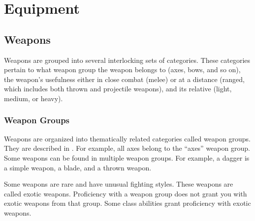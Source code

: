\chapter{Equipment}

\section{Weapons}\label{Weapons}

    Weapons are grouped into several interlocking sets of categories. These categories pertain to what weapon group the weapon belongs to (axes, bows, and so on), the weapon's usefulness either in close combat (melee) or at a distance (ranged, which includes both thrown and projectile weapons), and its relative  (light, medium, or heavy).

    \subsection{Weapon Groups}\label{Weapon Groups}

        Weapons are organized into thematically related categories called weapon groups. They are described in . For example, all axes belong to the ``axes'' weapon group. Some weapons can be found in multiple weapon groups. For example, a dagger is a simple weapon, a blade, and a thrown weapon.

        \label{Exotic Weapons} Some weapons are rare and have unusual fighting styles.
        These weapons are called exotic weapons.
        Proficiency with a weapon group does not grant you with exotic weapons from that group.
        Some class abilities grant proficiency with exotic weapons.

